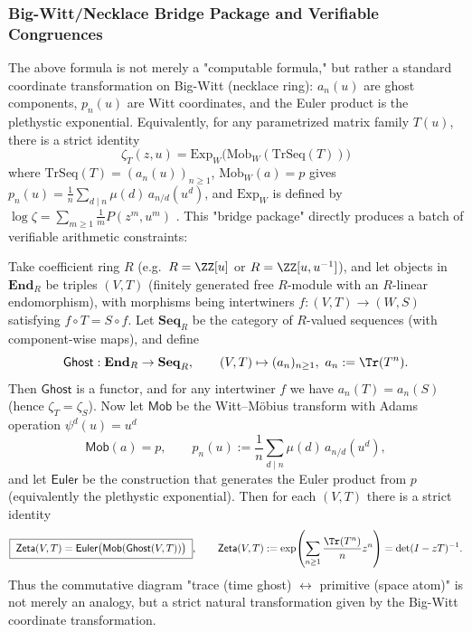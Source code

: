 \subsubsection{Big-Witt/Necklace Bridge Package and Verifiable Congruences}\label{app:witt-bridge-package}
The above formula is not merely a "computable formula," but rather a standard coordinate transformation on Big-Witt (necklace ring): $a_n(u)$ are ghost components, $p_n(u)$ are Witt coordinates, and the Euler product is the plethystic exponential. Equivalently, for any parametrized matrix family $T(u)$, there is a strict identity
\[
\boxed{\ \zeta_T(z,u)=\mathrm{Exp}_W\bigl(\mathrm{Mob}_W(\mathrm{TrSeq}(T))\bigr)\ }
\]
where $\mathrm{TrSeq}(T)=(a_n(u))_{n\ge 1}$, $\mathrm{Mob}_W(a)=p$ gives $p_n(u)=\frac1n\sum_{d\mid n}\mu(d)\,a_{n/d}(u^d)$, and $\mathrm{Exp}_W$ is defined by
\(
\log\zeta=\sum_{m\ge 1}\frac{1}{m}P(z^m,u^m)
\)
. This "bridge package" directly produces a batch of verifiable arithmetic constraints:

\begin{proposition}\label{prop:witt-bridge-functorial}
Take coefficient ring \(R\) (e.g.\ \(R=\ZZ[u]\) or \(R=\ZZ[u,u^{-1}]\)), and let objects in \(\mathbf{End}_R\) be triples \((V,T)\) (finitely generated free \(R\)-module with an \(R\)-linear endomorphism), with morphisms being intertwiners \(f:(V,T)\to (W,S)\) satisfying \(f\circ T=S\circ f\).
Let \(\mathbf{Seq}_R\) be the category of \(R\)-valued sequences (with component-wise maps), and define
\[
\mathsf{Ghost}:\mathbf{End}_R\to \mathbf{Seq}_R,\qquad
(V,T)\mapsto (a_n)_{n\ge 1},\ a_n:=\Tr(T^n).
\]
Then \(\mathsf{Ghost}\) is a functor, and for any intertwiner \(f\) we have \(a_n(T)=a_n(S)\) (hence \(\zeta_T=\zeta_S\)).
Now let \(\mathsf{Mob}\) be the Witt--Möbius transform with Adams operation \(\psi^d(u)=u^d\)
\[
\mathsf{Mob}(a)=p,\qquad
p_n(u):=\frac1n\sum_{d\mid n}\mu(d)\,a_{n/d}(u^d),
\]
and let \(\mathsf{Euler}\) be the construction that generates the Euler product from \(p\) (equivalently the plethystic exponential).
Then for each \((V,T)\) there is a strict identity
\[
\boxed{\;
\mathsf{Zeta}(V,T)
=\mathsf{Euler}\bigl(\mathsf{Mob}(\mathsf{Ghost}(V,T))\bigr)\; },
\qquad
\mathsf{Zeta}(V,T):=\exp\!\left(\sum_{n\ge 1}\frac{\Tr(T^n)}{n}z^n\right)=\det(I-zT)^{-1}.
\]
Thus the commutative diagram "trace (time ghost) \(\leftrightarrow\) primitive (space atom)" is not merely an analogy, but a strict natural transformation given by the Big-Witt coordinate transformation.
\end{proposition}

